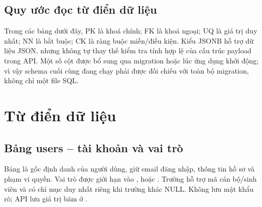 \subsection{Quy ước đọc từ điển dữ liệu}
Trong các bảng dưới đây, PK là khoá chính; FK là khoá ngoại; UQ là giá trị
duy nhất; NN là bắt buộc; CK là ràng buộc miền/điều kiện. Kiểu JSONB hỗ trợ
dữ liệu JSON, nhưng không tự thay thế kiểm tra tính hợp lệ của cấu trúc
payload trong API. Một số cột được bổ sung qua migration hoặc
 lúc ứng dụng khởi động; vì vậy schema cuối cùng
đang chạy phải được đối chiếu với toàn bộ migration, không chỉ một file SQL.

\section{Từ điển dữ liệu}
\label{sec:data-dictionary}

\subsection{Bảng users -- tài khoản và vai trò}
Bảng  là gốc định danh của người dùng, giữ email đăng nhập,
thông tin hồ sơ và phạm vi quyền. Vai trò được giới hạn vào
,  hoặc . Trường
 hỗ trợ mã cán bộ/sinh viên và có chỉ mục duy nhất
riêng khi trường khác NULL. Không lưu mật khẩu rõ; API lưu giá trị băm ở
.

